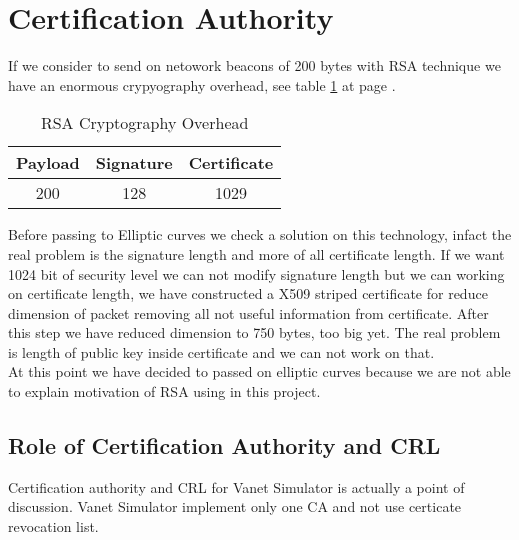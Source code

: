 \section{Certification Authority}
If we consider to send on netowork beacons of 200 bytes with RSA technique we have an enormous crypyography overhead, see table \ref{tab:RSAOverHead} at page \pageref{tab:RSAOverHead}.
\begin{table}[!ht]
	\centering
	\caption{RSA Cryptography Overhead}
	\begin{tabular}{|c|c|c|}
	\hline\hline 
	\textbf{Payload} & \textbf{Signature} & \textbf{Certificate}\\
	\hline
	200 & 128 & 1029 \\
	\hline
	\hline     %
 	\end{tabular} 
	\label{tab:RSAOverHead}
\end{table}
Before passing to Elliptic curves we check a solution on this technology, infact the real problem is the signature length and more of all certificate length. If we want 1024 bit of security level we can not modify signature length but we can working on certificate length, we have constructed a X509 striped certificate for reduce dimension of packet removing all not useful information from certificate. After this step we have reduced dimension to 750 bytes, too big yet. The real problem is length of public key inside certificate and we can not work on that.\\
At this point we have decided to passed on elliptic curves because we are not able to explain motivation of RSA using in this project.
\subsection{Role of Certification Authority and CRL}
Certification authority and CRL for Vanet Simulator is actually a point of discussion\cite{calandriello}. Vanet Simulator implement only one CA and not use certicate revocation list.